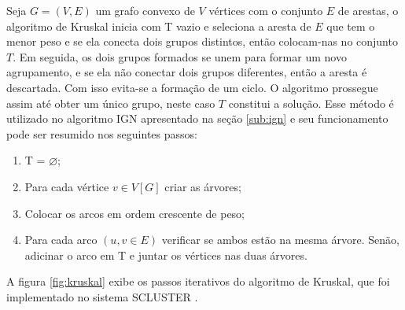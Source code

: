 Seja ${G = (V, E)}$ um grafo convexo de ${V}$ vértices com o conjunto ${E}$ de arestas, o algoritmo de Kruskal inicia com T vazio e seleciona a aresta de ${E}$ que tem o menor peso e se ela conecta dois grupos distintos, então colocam-nas no conjunto ${T}$. Em seguida, os dois grupos formados se unem para formar um novo agrupamento, e se ela não conectar dois grupos diferentes, então a aresta é descartada. Com isso evita-se a formação de um ciclo. O algoritmo prossegue assim até obter um único grupo, neste caso ${T}$ constitui a solução.
Esse método é utilizado no algoritmo IGN apresentado na seção \ref{sub:ign} e seu funcionamento pode ser resumido nos seguintes passos:
\begin{enumerate}
    \item T = ${\varnothing}$;
    \item Para cada vértice ${v \in V[G]}$ criar as árvores;
    \item Colocar os arcos em ordem crescente de peso;
    \item Para cada arco $({u, v} \in E)$ verificar se ambos estão na mesma árvore. Senão, adicinar o arco em T e juntar os vértices nas duas árvores.
\end{enumerate}

A figura \ref{fig:kruskal} exibe os passos iterativos do algoritmo de Kruskal, que foi implementado no sistema SCLUSTER \cite{scluster}.

\begin{figure}[!ht]
	\centering
\end{figure}

